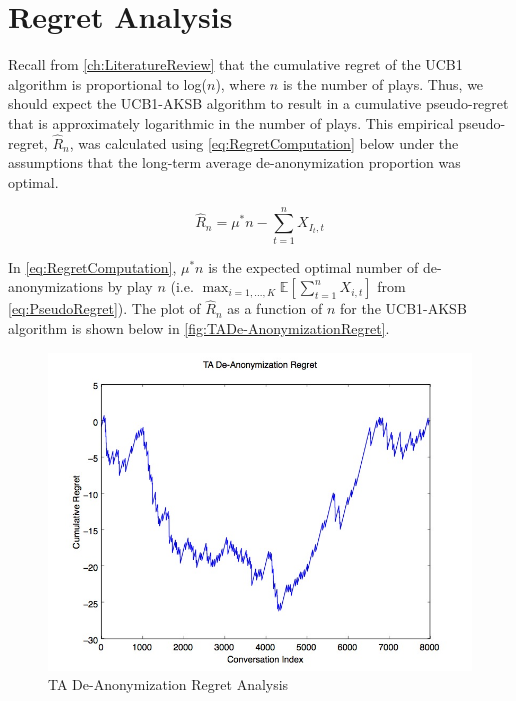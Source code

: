 \section{Regret Analysis}
\label{sec:RegretAnalysis}

Recall from \autoref{ch:LiteratureReview} that the cumulative regret of the UCB1 algorithm is proportional to log($n$), where $n$ is the number of plays. Thus, we should expect the UCB1-AKSB algorithm to result in a cumulative pseudo-regret that is approximately logarithmic in the number of plays. This empirical pseudo-regret, $\hat{R}_n$, was calculated using \autoref{eq:RegretComputation} below under the assumptions that the long-term average de-anonymization proportion was optimal.

\begin{equation}
\label{eq:RegretComputation}
\hat{R}_n = \mu^{*}n - \sum_{t=1}^{n}{X_{I_t, t}}
\end{equation}

In \autoref{eq:RegretComputation}, $\mu^{*}n$ is the expected optimal number of de-anonymizations by play $n$ (i.e. $\max_{i=1,...,K}{\mathbb{E}\left[\sum_{t=1}^{n}{X_{i, t}}\right]}$ from \autoref{eq:PseudoRegret}). The plot of $\hat{R}_n$ as a function of $n$ for the UCB1-AKSB algorithm is shown below in \autoref{fig:TADe-AnonymizationRegret}.

\begin{figure}[H]
\centering
\includegraphics[trim= 0mm 0mm 0mm 0mm, clip, scale=0.5]{./Figures/TADe-AnonymizationRegret.jpg}
\caption{TA De-Anonymization Regret Analysis}
\label{fig:TADe-AnonymizationRegret}
\end{figure}

